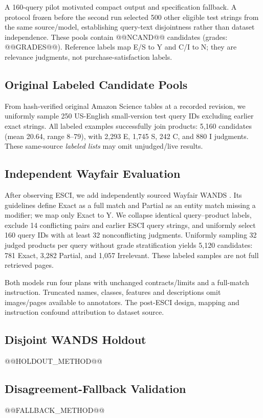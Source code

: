 \documentclass[conference]{IEEEtran}
\begin{document}
A 160-query pilot motivated compact output and specification fallback. A protocol frozen before the second run selected 500 other eligible test strings from the same source/model, establishing query-text disjointness rather than dataset independence. These pools contain @@NCAND@@ candidates (grades: @@GRADES@@). Reference labels map E/S to Y and C/I to N; they are relevance judgments, not purchase-satisfaction labels.

\subsection{Original Labeled Candidate Pools}
From hash-verified original Amazon Science tables at a recorded revision, we uniformly sample 250 US-English small-version test query IDs excluding earlier exact strings. All labeled examples successfully join products: 5,160 candidates (mean 20.64, range 8--79), with 2,293 E, 1,745 S, 242 C, and 880 I judgments. These same-source \emph{labeled lists} may omit unjudged/live results.

\subsection{Independent Wayfair Evaluation}
After observing ESCI, we add independently sourced Wayfair WANDS \cite{wands}. Its guidelines define Exact as a full match and Partial as an entity match missing a modifier; we map only Exact to Y. We collapse identical query--product labels, exclude 14 conflicting pairs and earlier ESCI query strings, and uniformly select 160 query IDs with at least 32 nonconflicting judgments. Uniformly sampling 32 judged products per query without grade stratification yields 5,120 candidates: 781 Exact, 3,282 Partial, and 1,057 Irrelevant. These labeled samples are not full retrieved pages.

Both models run four plans with unchanged contracts/limits and a full-match instruction. Truncated names, classes, features and descriptions omit images/pages available to annotators. The post-ESCI design, mapping and instruction confound attribution to dataset source.

\subsection{Disjoint WANDS Holdout}
@@HOLDOUT_METHOD@@

\subsection{Disagreement-Fallback Validation}
@@FALLBACK_METHOD@@
\end{document}
